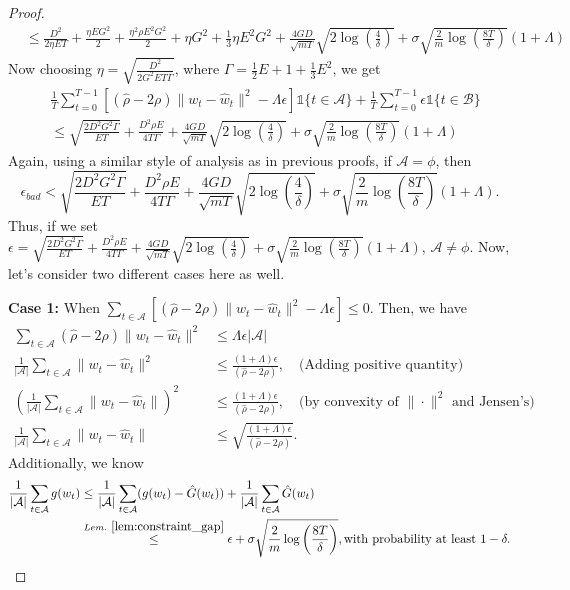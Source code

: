 \documentclass{article} %
\def\A{{\mathcal A}}
\def\B{{\mathcal B}}
\begin{document}
\begin{proof}
\begin{align*}
        & \leq  \frac{D^2}{2\eta E T} + \frac{\eta E G^2}{2} + \frac{\eta^2 \rho E^2 G^2 }{2} + \eta G^2 + \frac{1}{3}\eta E^2 G^2
        + \frac{4GD}{\sqrt{mT}}\sqrt{2\log(\frac{4}{\delta})}
        + \sigma\sqrt{\frac{2}{m} \log\left(\frac{8T}{\delta}\right)}(1 + \Lambda)
    \end{align*}
    Now choosing $\eta = \sqrt{\frac{D^2}{2G^2 E T \Gamma}}$, where $\Gamma = \frac{1}{2} E + 1 + \frac{1}{3} E^2$, we get
    \begin{align*}
        &\frac{1}{T}\sum_{t=0}^{T-1}[(\hat{\rho}-2\rho)\|w_t - \hat{w}_t\|^2 - {\Lambda} \epsilon]\mathds{1}\{t \in \A\} + \frac{1}{T}\sum_{t=0}^{T-1} \epsilon \mathds{1}\{t \in \B\}  
        \\
        & \leq  \sqrt{\frac{{2 D^2 G^2 \Gamma}}{{E T}}} + \frac{D^2 \rho E}{4T\Gamma}
        + \frac{4GD}{\sqrt{mT}}\sqrt{2\log(\frac{4}{\delta})}
        + \sigma\sqrt{\frac{2}{m} \log\left(\frac{8T}{\delta}\right)}(1 + \Lambda)
    \end{align*}
    Again, using a similar style of analysis as in previous proofs, if $\A = \phi$, then
    $$\epsilon_{bad} < \sqrt{\frac{{2 D^2 G^2 \Gamma}}{{E T}}} + \frac{D^2 \rho E}{4T\Gamma}
        + \frac{4GD}{\sqrt{mT}}\sqrt{2\log(\frac{4}{\delta})}
        + \sigma\sqrt{\frac{2}{m} \log\left(\frac{8T}{\delta}\right)}(1 + \Lambda).$$
    Thus, if we set $\epsilon = \sqrt{\frac{{2 D^2 G^2 \Gamma}}{{E T}}} + \frac{D^2 \rho E}{4T\Gamma}
        + \frac{4GD}{\sqrt{mT}}\sqrt{2\log(\frac{4}{\delta})}
        + \sigma\sqrt{\frac{2}{m} \log\left(\frac{8T}{\delta}\right)}(1 + \Lambda)$, $\A \neq \phi$.
    Now, let's consider two different cases here as well.
    
    \textbf{Case 1:} When $\sum_{t \in \A}[(\hat{\rho}-2\rho)\|w_t - \hat{w}_t\|^2 - {\Lambda} \epsilon] \leq 0.$ Then, we have
    \begin{align*}
        \sum_{t \in \A}(\hat{\rho}-2\rho)\|w_t - \hat{w}_t\|^2 &\leq {\Lambda} \epsilon |\A|
        \\
        \frac{1}{|\A|}\sum_{t \in \A}\|w_t - \hat{w}_t\|^2 &\leq \frac{{(1+\Lambda)} \epsilon}{(\hat{\rho}-2\rho)}, \quad \text{(Adding positive quantity)}
        \\
        \left(\frac{1}{|\A|}\sum_{t \in \A}\|w_{t} - \hat{w}_t\|\right)^2 &\leq \frac{{(1+\Lambda)} \epsilon}{(\hat{\rho}-2\rho)}, \quad \text{(by convexity of $\|\cdot\|^2$ and Jensen's)}
        \\
        \frac{1}{|\A|}\sum_{t \in \A}\|w_{t} - \hat{w}_t\| &\leq \sqrt{\frac{{(1+\Lambda)} \epsilon}{(\hat{\rho}-2\rho)}}.
    \end{align*}
    Additionally, we know
    \begin{align*}
         \frac{1}{|\A|} \sum_{t\in \A}g(w_t)
        & \leq \frac{1}{|\A|} \sum_{t\in \A}(g(w_t) - \hat{G}(w_t)) + \frac{1}{|\A|} \sum_{t\in \A}\hat{G}(w_t)
        \\
        &\overset{Lem.~\ref{lem:constraint_gap}}{\leq} \epsilon + \sigma \sqrt{\frac{2}{m} \log\left(\frac{8T}{\delta}\right)}, \text{with probability at least } 1-\delta.
    \end{align*}


\end{proof}
\end{document}
